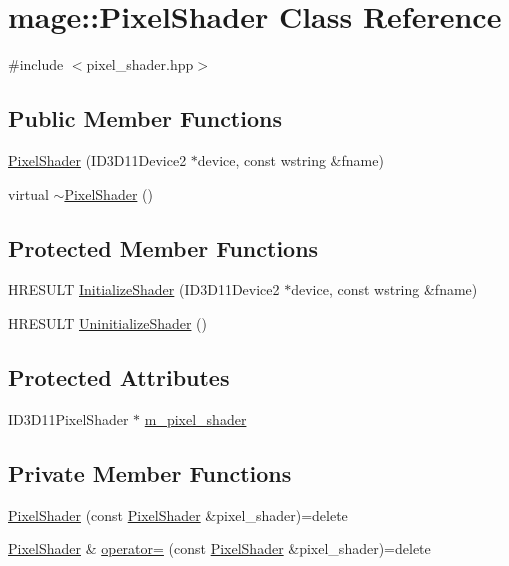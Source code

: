 \hypertarget{classmage_1_1_pixel_shader}{}\section{mage\+:\+:Pixel\+Shader Class Reference}
\label{classmage_1_1_pixel_shader}


{\ttfamily \#include $<$pixel\+\_\+shader.\+hpp$>$}

\subsection*{Public Member Functions}
\begin{DoxyCompactItemize}
\item 
\hyperlink{classmage_1_1_pixel_shader_ab481009e170eb405a962ad177d86c3ae}{Pixel\+Shader} (I\+D3\+D11\+Device2 $\ast$device, const wstring \&fname)
\item 
virtual \hyperlink{classmage_1_1_pixel_shader_aac21a59d5d614f5bf1905f01479de44e}{$\sim$\+Pixel\+Shader} ()
\end{DoxyCompactItemize}
\subsection*{Protected Member Functions}
\begin{DoxyCompactItemize}
\item 
H\+R\+E\+S\+U\+LT \hyperlink{classmage_1_1_pixel_shader_ae7b66bd5193c91a02c679acf06367f44}{Initialize\+Shader} (I\+D3\+D11\+Device2 $\ast$device, const wstring \&fname)
\item 
H\+R\+E\+S\+U\+LT \hyperlink{classmage_1_1_pixel_shader_a5d839de7aac9a6655c2a2296aafbe231}{Uninitialize\+Shader} ()
\end{DoxyCompactItemize}
\subsection*{Protected Attributes}
\begin{DoxyCompactItemize}
\item 
I\+D3\+D11\+Pixel\+Shader $\ast$ \hyperlink{classmage_1_1_pixel_shader_a07ec400ce08c37f71ce3ffa40d1bfdf6}{m\+\_\+pixel\+\_\+shader}
\end{DoxyCompactItemize}
\subsection*{Private Member Functions}
\begin{DoxyCompactItemize}
\item 
\hyperlink{classmage_1_1_pixel_shader_a361df943e40e9015ac4b769af130ce79}{Pixel\+Shader} (const \hyperlink{classmage_1_1_pixel_shader}{Pixel\+Shader} \&pixel\+\_\+shader)=delete
\item 
\hyperlink{classmage_1_1_pixel_shader}{Pixel\+Shader} \& \hyperlink{classmage_1_1_pixel_shader_ac3a3535b2751237f4aad110dca05d0c3}{operator=} (const \hyperlink{classmage_1_1_pixel_shader}{Pixel\+Shader} \&pixel\+\_\+shader)=delete
\end{DoxyCompactItemize}


